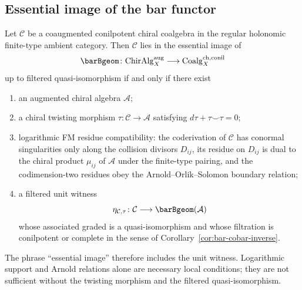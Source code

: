 \subsection{Essential image of the bar functor}

\begin{theorem}
\label{thm:essential-image-bar}
Let $\mathcal{C}$ be a coaugmented conilpotent chiral coalgebra in the
regular holonomic finite-type ambient category. Then
$\mathcal{C}$ lies in the essential image of
\[
\barBgeom\colon
\mathrm{ChirAlg}^{\mathrm{aug}}_X\longrightarrow
\mathrm{Coalg}^{\mathrm{ch,conil}}_X
\]
up to filtered quasi-isomorphism if and only if there exist
\begin{enumerate}[label=\textup{(\roman*)}]
\item an augmented chiral algebra $\mathcal{A}$;
\item a chiral twisting morphism
 $\tau\colon\mathcal{C}\to\mathcal{A}$ satisfying
 $d\tau+\tau\smile\tau=0$;
\item logarithmic FM residue compatibility: the coderivation of
 $\mathcal{C}$ has conormal singularities only along the collision
 divisors $D_{ij}$, its residue on $D_{ij}$ is dual to the chiral
 product $\mu_{ij}$ of $\mathcal{A}$ under the finite-type pairing, and
 the codimension-two residues obey the Arnold--Orlik--Solomon boundary
 relation;
\item a filtered unit witness
 \[
 \eta_{\mathcal{C},\tau}\colon
 \mathcal{C}\longrightarrow \barBgeom(\mathcal{A})
 \]
 whose associated graded is a quasi-isomorphism and whose filtration is
 conilpotent or complete in the sense of
 Corollary~\ref{cor:bar-cobar-inverse}.
\end{enumerate}
The phrase ``essential image'' therefore includes the unit witness.
Logarithmic support and Arnold relations alone are necessary local
conditions; they are not sufficient without the twisting morphism and
the filtered quasi-isomorphism.
\end{theorem}

